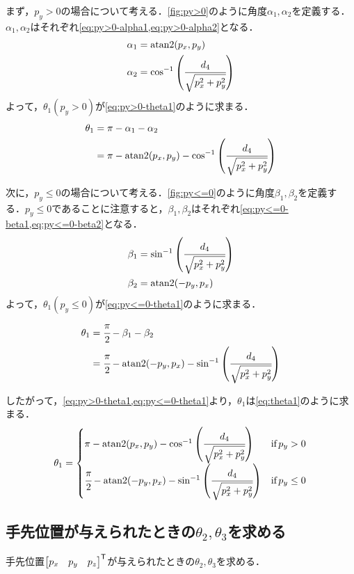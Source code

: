 \documentclass{ltjsarticle}
\begin{document}
まず，$p_y > 0$の場合について考える．\cref{fig:py>0}のように角度$\alpha_1, \alpha_2$を定義する．$\alpha_1, \alpha_2$はそれぞれ\cref{eq:py>0-alpha1,eq:py>0-alpha2}となる．
\begin{align}
	\label{eq:py>0-alpha1}
	\alpha_1 &= \text{atan2}(p_x, p_y) \\
	\label{eq:py>0-alpha2}
	\alpha_2 &= \cos^{-1}\qty(\cfrac{d_4}{\sqrt{p_x^2 + p_y^2}})
\end{align}
よって，$\theta_1 (p_y > 0)$が\cref{eq:py>0-theta1}のように求まる．
\begin{align}
	\theta_1 &= \pi - \alpha_1 - \alpha_2 \\
	\label{eq:py>0-theta1}
	&= \pi - \text{atan2}(p_x, p_y) - \cos^{-1}\qty(\cfrac{d_4}{\sqrt{p_x^2 + p_y^2}})
\end{align}

次に，$p_y \leq 0$の場合について考える．\cref{fig:py<=0}のように角度$\beta_1, \beta_2$を定義する．$p_y \leq 0$であることに注意すると，$\beta_1, \beta_2$はそれぞれ\cref{eq:py<=0-beta1,eq:py<=0-beta2}となる．
\begin{align}
	\label{eq:py<=0-beta1}
	\beta_1 &= \sin^{-1}\qty(\cfrac{d_4}{\sqrt{p_x^2 + p_y^2}}) \\
	\label{eq:py<=0-beta2}
	\beta_2 &= \text{atan2}(-p_y, p_x) \\
\end{align}
よって，$\theta_1 (p_y \leq 0)$が\cref{eq:py<=0-theta1}のように求まる．
\begin{align}
	\theta_1 &= \cfrac{\pi}{2} - \beta_1 - \beta_2 \\
	\label{eq:py<=0-theta1}
	&= \cfrac{\pi}{2} - \text{atan2}(-p_y, p_x) - \sin^{-1}\qty(\cfrac{d_4}{\sqrt{p_x^2 + p_y^2}})
\end{align}

したがって，\cref{eq:py>0-theta1,eq:py<=0-theta1}より，$\theta_1$は\cref{eq:theta1}のように求まる．
\begin{align}
	\label{eq:theta1}
	\theta_1 = 
	\begin{cases}
		\pi - \text{atan2}(p_x, p_y) - \cos^{-1}\qty(\cfrac{d_4}{\sqrt{p_x^2 + p_y^2}}) & \text{if}\,p_y > 0 \\
		\cfrac{\pi}{2} - \text{atan2}(-p_y, p_x) - \sin^{-1}\qty(\cfrac{d_4}{\sqrt{p_x^2 + p_y^2}}) & \text{if}\,p_y \leq 0
	\end{cases}
\end{align}

\subsection{手先位置が与えられたときの$\theta_2, \theta_3$を求める}\label{subsec:手先位置が与えられたときのtheta2,theta3を求める}
手先位置$\mqty[p_x & p_y & p_z]^\mathsf{T}$が与えられたときの$\theta_2,\theta_3$を求める．
\end{document}

